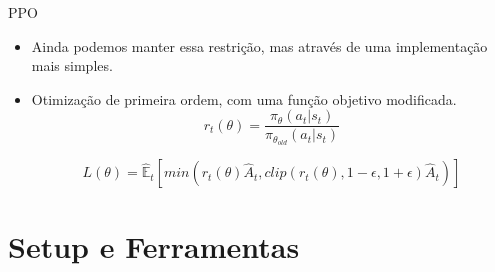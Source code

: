 \documentclass{beamer}
\begin{document}
\begin{frame}{PPO}
\begin{itemize}
\item
	Ainda podemos manter essa restrição, mas através de uma implementação mais simples.
\item
	Otimização de primeira ordem, com uma função objetivo modificada.
\begin{equation}
r_t(\theta) = \frac{\pi_{\theta}(a_t|s_t)}{\pi_{\theta_{old}}(a_t|s_t)}
\label{eq:def_r_t}
\end{equation}

\begin{equation}
L(\theta) = \mathbb{\hat{E}}_t \left[ min(r_t(\theta)\hat{A}_t, clip(r_t(\theta),1-\epsilon,1+\epsilon)\hat{A}_t) \right]
\label{eq:PPO_objective_function}
\end{equation}
\end{itemize}
\end{frame}

\section{Setup e Ferramentas}
\end{document}
